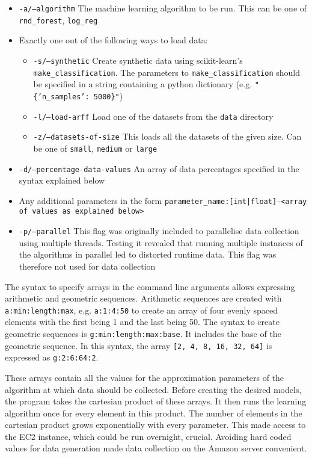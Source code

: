 \documentclass[a4paper,12pt,twoside,openright]{report}
\begin{document}
\begin{itemize}
\item \texttt{-a/--algorithm} The machine learning algorithm to be run. This can be one of \texttt{rnd\_forest}, \texttt{log\_reg}
\item Exactly one out of the following ways to load data:
\begin{itemize}[label=$\star$]
        \item \texttt{-s/--synthetic} Create synthetic data using scikit-learn's \texttt{make\_classification}. The parameters to \texttt{make\_classification} should be specified in a string containing a python dictionary (e.g. \texttt{"\{'n\_samples': 5000\}"})
        \item \texttt{-l/--load-arff} Load one of the datasets from the \texttt{data} directory
        \item \texttt{-z/--datasets-of-size} This loads all the datasets of the given size. Can be one of \texttt{small}, \texttt{medium} or \texttt{large}
     \end{itemize}
\item \texttt{-d/--percentage-data-values} An array of data percentages specified in the syntax explained below
\item Any additional parameters in the form \texttt{parameter\_name:[int|float]-<array of values as explained below>}
\item \texttt{-p/--parallel} This flag was originally included to parallelise data collection using multiple threads. Testing it revealed that running multiple instances of the algorithms in parallel led to distorted runtime data. This flag was therefore not used for data collection
\end{itemize}

The syntax to specify arrays in the command line arguments allows expressing arithmetic and geometric sequences. Arithmetic sequences are created with \texttt{a:min:length:max}, e.g. \texttt{a:1:4:50} to create an array of four evenly spaced elements with the first being 1 and the last being 50. The syntax to create geometric sequences is \texttt{g:min:length:max:base}. It includes the base of the geometric sequence. In this syntax, the array \texttt{[2, 4, 8, 16, 32, 64]} is expressed as \texttt{g:2:6:64:2}. 
	

These arrays contain all the values for the approximation parameters of the algorithm at which data should be collected. Before creating the desired models, the program takes the cartesian product of these arrays. It then runs the learning algorithm once for every element in this product. The number of elements in the cartesian product grows exponentially with every parameter. This made access to the EC2 instance, which could be run overnight, crucial. Avoiding hard coded values for data generation made data collection on the Amazon server convenient.
\end{document}
